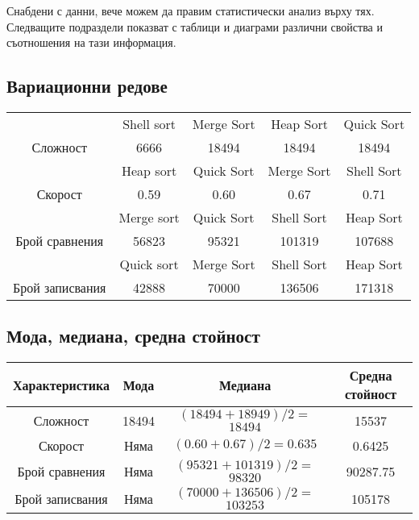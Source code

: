 \documentclass[12pt,a4paper]{article}
\begin{document}
Снабдени с данни, вече можем да правим статистически анализ върху тях. Следващите подраздели показват с таблици и диаграми различни свойства и съотношения на тази информация.

\subsection{Вариационни редове}

\begin{center}
\begin{tabular}{|c|c c c c|}
	\hline
	 & Shell sort & Merge Sort & Heap Sort & Quick Sort \\[3pt]
	Сложност & 6666 & 18494 & 18494 & 18494 \\[3pt]
	\hline\hline
	 & Heap sort & Quick Sort & Merge Sort & Shell Sort \\[3pt]
	Скорост & 0.59 & 0.60 & 0.67 & 0.71 \\[3pt]
	\hline\hline
	 & Merge sort & Quick Sort & Shell Sort & Heap Sort \\[3pt]
	Брой сравнения & 56823 & 95321 & 101319 & 107688 \\[3pt]
	\hline\hline
	 & Quick sort & Merge Sort & Shell Sort & Heap Sort \\[3pt]
	Брой записвания & 42888 & 70000 & 136506 & 171318 \\[3pt]
	\hline
\end{tabular}
\end{center}

\subsection{Мода, медиана, средна стойност}

\begin{center}
\begin{tabular}{|c|c c c|}
	\hline
	Характеристика & Мода & Медиана  & Средна стойност\\[3pt]
	\hline\hline
	Сложност & 18494 & $(18494 + 18949)/2 = $\underline{$18494$} & 15537 \\[3pt]
	Скорост & Няма & $(0.60+0.67)/2 = $\underline{$0.635$} & 0.6425 \\[3pt]
	Брой сравнения & Няма & $(95321 + 101319)/2 = $\underline{$98320$} & 90287.75 \\[3pt]
	Брой записвания & Няма & $(70000 + 136506)/2 = $\underline{$103253$} & 105178 \\[3pt]
	\hline
\end{tabular}
\end{center}
\end{document}
